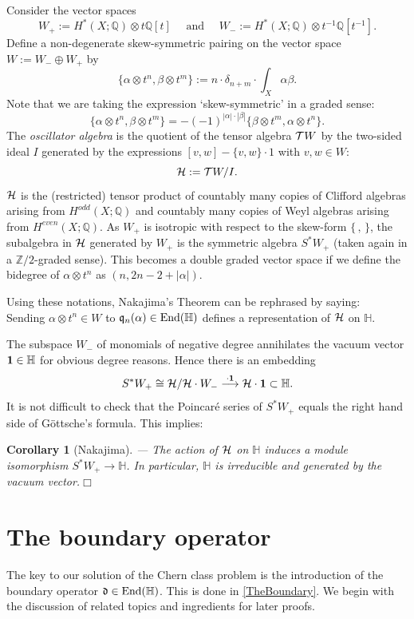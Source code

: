 \documentclass[twoside,11pt]{article}
\newtheorem{corollary}[theorem]{Corollary}
\newcommand{\qed}{\hspace*{\fill}$\Box$\vspace{2ex}}
\newcommand{\kh}{{\cal H}}
\newcommand{\kt}{{\cal T}}
\newcommand{\IH}{{\mathbb H}}
\newcommand{\IQ}{{\mathbb Q}}
\newcommand{\IZ}{{\mathbb Z}}
\newcommand{\gothd}{{\mathfrak d}}
\newcommand{\gothq}{{\mathfrak q}}
\newcommand{\isom}{\cong}
\newcommand{\tensor}{\otimes}
\newcommand{\End}{{\rm End}}
\newcommand{\dd}{\gothd}
\newcommand{\qq}{\gothq}
\newcommand{\vacuum}{{\bf 1}}
\newcommand{\lra}{\longrightarrow}
\begin{document}
Consider the vector spaces
$$W_+:=H^*(X;\IQ)\tensor t\IQ[t]\quad\mbox{ and }\quad
W_-:=H^*(X;\IQ)\tensor t^{-1}\IQ[t^{-1}].$$ 
Define a non-degenerate skew-symmetric pairing on the vector space
$W:=W_-\oplus W_+$
by
$$\{\alpha\tensor t^n,\beta\tensor t^m\}
:=n\cdot\delta_{n+m}\cdot\int_X\alpha\beta.$$
Note that we are taking the expression `skew-symmetric' in a graded sense:   $$\{\alpha\tensor t^n,\beta\tensor t^m\}=-(-1)^{|\alpha|\cdot|\beta|}\{\beta\tensor t^m,\alpha\tensor t^n\}.$$
The {\em oscillator algebra} is the quotient of the tensor algebra $\kt W$ by
the two-sided ideal $I$ generated by the expressions $[v,w]-\{v,w\}\cdot 1$
with $v,w\in W$:
$$\kh:=\kt W/I.$$
$\kh$ is the (restricted) tensor product of countably many copies of Clifford
algebras arising from $H^{odd}(X;\IQ)$ and countably many copies of Weyl algebras arising from $H^{even}(X;\IQ)$.
As $W_+$ is isotropic with respect to the skew-form
$\{\,,\,\}$, the subalgebra in $\kh$ generated by $W_+$ is the symmetric algebra
$S^*W_+$ (taken again in a $\IZ/2$-graded sense). This becomes a double graded vector
space if we define the bidegree of $\alpha\tensor t^n$ as $(n,2n-2+|\alpha|)$.

Using these notations, Nakajima's Theorem can be rephrased by saying:\\
Sending $\alpha\tensor t^n\in W$ to $\qq_n(\alpha)\in\End(\IH)$ defines a
representation of $\kh$ on $\IH$.

The subspace $W_-$ of monomials of negative degree annihilates the vacuum
vector $\vacuum\in \IH$ for obvious degree reasons. Hence there is an embedding 
$$S^*W_+\isom \kh/\kh\cdot W_{-}\stackrel{\cdot\vacuum}{\lra} \kh\cdot\vacuum\subset \IH.$$
It is not difficult to check that the Poincar\'e series of $S^*W_+$ equals the
right hand side of G\"ottsche's formula. This implies:

\begin{corollary}[Nakajima]--- The action of $\kh$ on $\IH$ induces a module
isomorphism $S^*W_+\to \IH$. In particular, $\IH$ is irreducible and generated
by the vacuum vector.\qed
\end{corollary}



\section{The boundary operator}\label{TheDerivative}

The key to our solution of the Chern class problem is the introduction of
the boundary operator $\dd\in \End(\IH)$. This is done in \ref{TheBoundary}. We
begin with the discussion of related topics and ingredients for later proofs.
\end{document}
